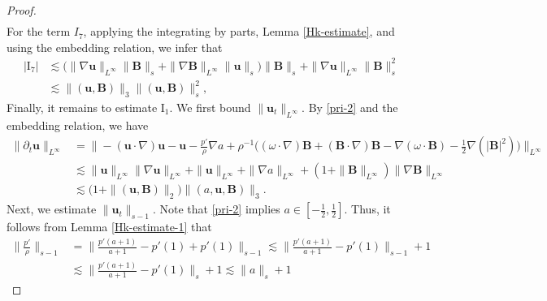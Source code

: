 \documentclass[12pt, reqno]{amsart}
\numberwithin{equation}{section}
\numberwithin{equation}{section}
\def\div{ \hbox{\rm div}\,  }
\numberwithin{equation}{section}
\numberwithin{equation}{section}
\theoremstyle{remark}
\def\div{ \hbox{\rm div}\,  }
\def\u{ \mathbf{u} }
\def\b{ \mathbf{B} }
\begin{document}
\begin{proof}
\begin{equation*}
\begin{split}
\end{split}\end{equation*}
For the term $I_7$, applying the  integrating by parts,  Lemma \ref{Hk-estimate}, and using the embedding relation, we infer that
\begin{equation*}\begin{split}
|\textrm{I}_{7}|
&\lesssim\big(\|\nabla \u\|_{L^\infty}\| \b\|_s+\|\nabla \b\|_{L^\infty}\|\u\|_s\big)\|\b\|_s+\|\nabla \u\|_{L^\infty}\|\b\|^{2}_s\\&\lesssim\|(\u,\b)\|_{3}\|(\u,\b)\|^{2}_s,
\end{split}\end{equation*}
Finally, it remains to estimate $\textrm{I}_{1}.$ We first bound $\|\u_t\|_{L^\infty}.$ By \eqref{pri-2}
and the embedding relation,  we have
\begin{equation}\begin{split}\label{pri-5}
\|\partial_t\u\|_{L^\infty}&=\Big\|-(\u\cdot\nabla)\u-\u-\frac{p'}{\rho}\nabla a+\rho^{-1}\big((\omega\cdot \nabla) \b+(\b\cdot \nabla) \b-\nabla(\omega\cdot \b)-\frac12\nabla(|\b|^2)\big)\Big\|_{L^\infty}\\
&\lesssim\|\u\|_{L^\infty}\|\nabla\u\|_{L^\infty}+\|\u\|_{L^\infty}+\|\nabla a\|_{L^\infty}+(1+\|\b\|_{L^\infty})\|\nabla\b\|_{L^\infty}\\
&\lesssim\big(1+\|(\u,\b)\|_{2}\big)\|(a,\u,\b)\|_3.
\end{split}\end{equation}
Next, we estimate $\|\u_t\|_{s-1}.$ Note that \eqref{pri-2} implies $a\in[-\frac12,\frac12]$. Thus, it follows from Lemma \ref {Hk-estimate-1}
that
\begin{equation*}\begin{split}
\Big\|\frac{p'}{\rho}\Big\|_{s-1}&=\Big\|\frac{p'(a+1)}{a+1}-p'(1)+p'(1)\Big\|_{s-1}\lesssim\Big\|\frac{p'(a+1)}{a+1}-p'(1)\Big\|_{s-1}+1\\
&\lesssim\Big\|\frac{p'(a+1)}{a+1}-p'(1)\Big\|_{s}+1\lesssim\|a\|_{s}+1
\end{split}\end{equation*}

\end{proof}
\end{document}
